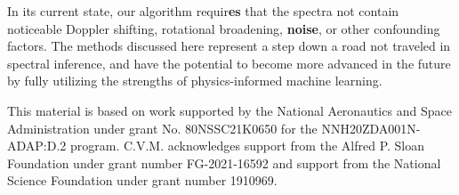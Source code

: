 \documentclass[twocolumn, linenumbers]{aastex631}
\begin{document}
In its current state, our algorithm requir\textbf{es} that the spectra not contain noticeable Doppler shifting, rotational broadening, \textbf{noise}, or other confounding factors.
The methods discussed here represent a step down a road not traveled in spectral inference, and have the potential to become more advanced in the future by fully utilizing the strengths of physics-informed machine learning.

\vspace{0.5cm}
This material is based on work supported by the National Aeronautics and Space Administration under grant No. 80NSSC21K0650 for the NNH20ZDA001N-ADAP:D.2 program. C.V.M. acknowledges support from the Alfred P. Sloan Foundation under grant number FG-2021-16592 and support from the National Science Foundation under grant number 1910969.
\vspace{0.5cm}


\pagebreak

\end{document}
